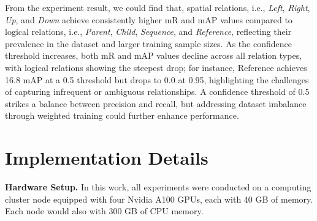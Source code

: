 \begin{table}[ht]
\centering
\caption{{mAP$_g$ Results at different relation confidence thresholds.}}
\renewcommand{\arraystretch}{1.2}
\label{tab:mAPg_results_r_threshold}
\end{table}

{From the experiment result, we could find that, spatial relations, i.e.,  \textit{Left}, \textit{Right}, \textit{Up}, and \textit{Down} achieve consistently higher mR and mAP values compared to logical relations, i.e., \textit{Parent}, \textit{Child}, \textit{Sequence}, and \textit{Reference}, reflecting their prevalence in the dataset and larger training sample sizes. As the confidence threshold increases, both mR and mAP values decline across all relation types, with logical relations showing the steepest drop; for instance, Reference achieves 16.8 mAP at a 0.5 threshold but drops to 0.0 at 0.95, highlighting the challenges of capturing infrequent or ambiguous relationships. A confidence threshold of 0.5 strikes a balance between precision and recall, but addressing dataset imbalance through weighted training could further enhance performance.}

\section{Implementation Details}
\label{appendix:implementation}

\noindent \textbf{Hardware Setup.}  In this work, all experiments were conducted on a computing cluster node equipped with four Nvidia A100 GPUs, each with 40 GB of memory. Each node would also with $300$ GB of CPU memory.

